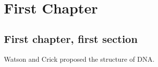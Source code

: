 \chapter{First Chapter}
\section{First chapter, first section}
Watson and Crick \citeyearpar{watson53} proposed the structure of DNA.


